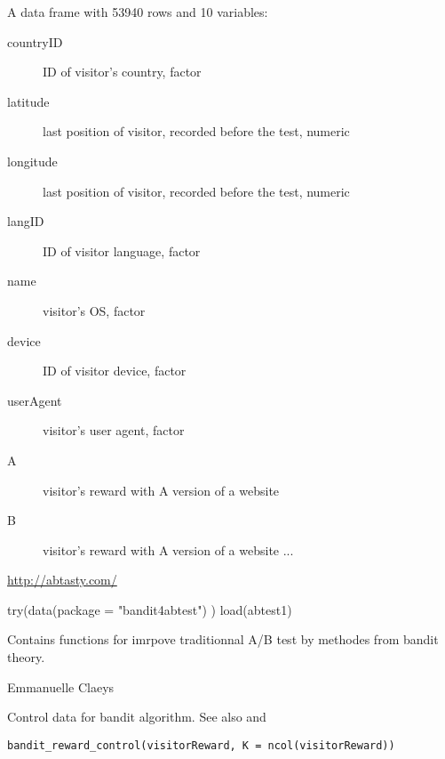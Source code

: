 \documentclass[letterpaper]{book}
\begin{document}
\begin{Format}
A data frame with 53940 rows and 10 variables:
\begin{description}

\item[countryID] ID of visitor's country, factor
\item[latitude] last position of visitor, recorded before the test, numeric
\item[longitude] last position of visitor, recorded before the test, numeric
\item[langID] ID of visitor language, factor
\item[name] visitor's OS, factor
\item[device] ID of visitor device, factor
\item[userAgent] visitor's user agent, factor
\item[A] visitor's reward with A version of a website
\item[B] visitor's reward with A version of a website
...

\end{description}
\end{Format}
%
\begin{Source}\relax
\url{http://abtasty.com/}
\end{Source}
%
\begin{Examples}
\begin{ExampleCode}
 try(data(package = "bandit4abtest") )
 load(abtest1)
\end{ExampleCode}
\end{Examples}
%
\begin{Description}\relax
Contains functions for imrpove traditionnal A/B test by methodes from bandit theory.
\end{Description}
%
\begin{Author}\relax
Emmanuelle Claeys 
\end{Author}
%
\begin{Description}\relax
Control data for bandit algorithm.
See also  and 
\end{Description}
%
\begin{Usage}
\begin{verbatim}
bandit_reward_control(visitorReward, K = ncol(visitorReward))
\end{verbatim}
\end{Usage}
\end{document}
